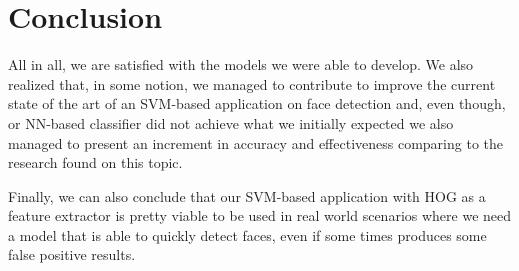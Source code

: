 \section{Conclusion}
All in all, we are satisfied with the models we were able to develop. We also realized that, in some notion, we managed to contribute to improve the current state of the art of an SVM-based application on face detection and, even though, or NN-based classifier did not achieve what we initially expected we also managed to present an increment in accuracy and effectiveness comparing to the research found on this topic.

Finally, we can also conclude that our SVM-based application with HOG as a feature extractor is pretty viable  to be used in real world scenarios where we need a model that is able to quickly detect faces, even if some times produces some false positive results.